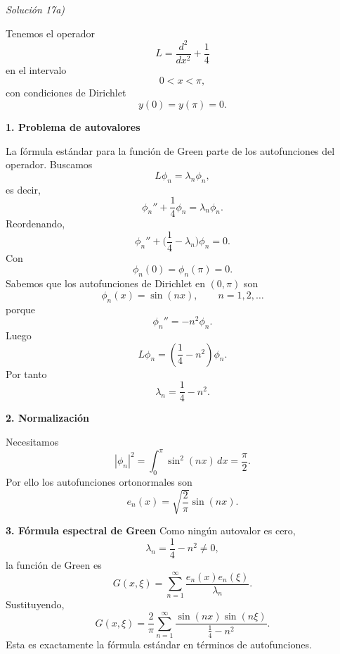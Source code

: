 \documentclass[11pt,spanish]{article}
\begin{document}
%
%
%
%

\vspace{0.5cm}
{\em Soluci\'on 17a)}
\vspace{0.5cm}

Tenemos el operador
$$
L=\frac{d^2}{dx^2}+\frac14
$$
en el intervalo
$$
0<x<\pi,
$$
con condiciones de Dirichlet
$$
y(0)=y(\pi)=0.
$$

{\bf 1. Problema de autovalores}

La fórmula estándar para la función de Green parte de los autofunciones del operador.
Buscamos
$$
L\phi_n=\lambda_n\phi_n,
$$
es decir,
$$
\phi_n''+\frac14\phi_n=\lambda_n\phi_n.
$$
Reordenando,
$$
\phi_n''+\Big(\frac14-\lambda_n\Big)\phi_n=0.
$$
Con
$$
\phi_n(0)=\phi_n(\pi)=0.
$$
Sabemos que los autofunciones de Dirichlet en $(0,\pi)$ son
$$
\boxed{
\phi_n(x)=\sin(nx),
\qquad n=1,2,\ldots
}
$$
porque
$$
\phi_n''=-n^2\phi_n.
$$
Luego
$$
L\phi_n
=
\left(\frac14-n^2\right)\phi_n.
$$
Por tanto
$$
\boxed{\lambda_n=\frac14-n^2.}
$$

{\bf 2. Normalización}

Necesitamos
$$
|\phi_n|^2
=
\int_0^\pi \sin^2(nx)\,dx
=
\frac{\pi}{2}.
$$
Por ello los autofunciones ortonormales son
$$
\boxed{
e_n(x)
=
\sqrt{\frac2\pi}\sin(nx).
}
$$

{\bf 3. Fórmula espectral de Green}
Como ningún autovalor es cero,
$$
\lambda_n=\frac14-n^2\neq0,
$$
la función de Green es
$$
\boxed{
G(x,\xi)
=
\sum_{n=1}^{\infty}
\frac{e_n(x)e_n(\xi)}
{\lambda_n}.
}
$$
Sustituyendo,
$$
\boxed{
G(x,\xi)
=
\frac2\pi
\sum_{n=1}^{\infty}
\frac{\sin(nx)\sin(n\xi)}
{\frac14-n^2}.
}
$$
Esta es exactamente la fórmula estándar en términos de autofunciones.
\end{document}
